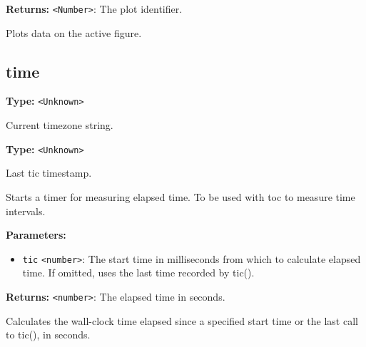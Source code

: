 \documentclass[12pt,a4paper]{article}
\begin{document}
\noindent \textbf{Returns:} \texttt{<Number>}: The plot identifier.

\noindent Plots data on the active figure.


\subsection{time}
\vspace{5mm}
\noindent {}\vspace{4mm}


\noindent \textbf{Type:} \texttt{<Unknown>}

\noindent Current timezone string.

\vspace{5mm}
\noindent {}\vspace{4mm}


\noindent \textbf{Type:} \texttt{<Unknown>}

\noindent Last tic timestamp.

\vspace{5mm}
\noindent {}


\noindent Starts a timer for measuring elapsed time. To be used with \textasciigrave{}toc\textasciigrave{} to measure time intervals.

\vspace{5mm}
\noindent {}


\noindent \textbf{Parameters:}
\begin{itemize}
  \item \texttt{tic} \texttt{<number>}: The start time in milliseconds from which to calculate elapsed time. If omitted, uses the last time recorded by \textasciigrave{}tic()\textasciigrave{}.
\end{itemize}

\noindent \textbf{Returns:} \texttt{<number>}: The elapsed time in seconds.

\noindent Calculates the wall-clock time elapsed since a specified start time or the last call to \textasciigrave{}tic()\textasciigrave{}, in seconds.
\end{document}
